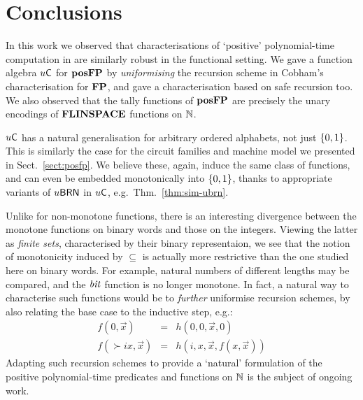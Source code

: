 \documentclass{lmcs}
\begin{document}

\section{Conclusions}
\label{sect:concs}
In this work we observed that characterisations of `positive' polynomial-time computation in \cite{LautemannSS96:on-pos-p} are similarly robust in the functional setting. 
We gave a function algebra $u \mathsf{C}$ for $\mathbf{pos}\mathbf{FP}$ by \emph{uniformising} the recursion scheme in Cobham's characterisation for $\mathbf{FP}$, and gave a characterisation based on safe recursion too.
We also observed that the tally functions of $\mathbf{pos}\mathbf{FP}$ are precisely the unary encodings of $\mathbf{FLINSPACE}$ functions on $\mathbb{N}$.

$u \mathsf{C}$ has a natural generalisation for arbitrary ordered alphabets, not just $\{0,1\}$. This is similarly the case for the circuit families and machine model we presented in Sect.~\ref{sect:posfp}.
We believe these, again, induce the same class of functions, and can even be embedded monotonically into $\{0,1\}$, thanks to appropriate variants of $u\mathsf{BRN}$ in $u \mathsf{C}$, e.g.~Thm.~\ref{thm:sim-ubrn}.

Unlike for non-monotone functions, there is an interesting divergence between the monotone functions on binary words and those on the integers.
Viewing the latter as \emph{finite sets}, characterised by their binary representaion, we see that the notion of monotonicity induced by $\subseteq$ is actually more restrictive than the one studied here on binary words. For example, natural numbers of different lengths may be compared, and the $\mathit{bit}$ function is no longer monotone. 
In fact, a natural way to characterise such functions would be to \emph{further} uniformise recursion schemes, by also relating the base case to the inductive step, e.g.:
\[
\begin{array}{rcl}
f(0, \vec x) & = & h(0, 0, \vec x , 0) \\
f(\succ i x , \vec x) & = & h(i, x , \vec x , f(x, \vec x))
\end{array}
\]
Adapting such recursion schemes to provide a `natural' formulation of the positive polynomial-time predicates and functions on $\mathbb{N}$ is the subject of ongoing work.
\end{document}
